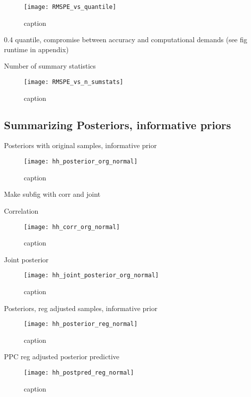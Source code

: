 \begin{figure}[H]
    \centering
    \texttt{[image: RMSPE\_vs\_quantile]}
    \caption{caption}
    \label{fig:fig1}
\end{figure} 

0.4 quantile, compromise between accuracy and computational demands (see fig runtime in appendix)

Number of summary statistics

\begin{figure}[H]
    \centering
    \texttt{[image: RMSPE\_vs\_n\_sumstats]}
    \caption{caption}
    \label{fig:fig1}
\end{figure} 


\subsection{Summarizing Posteriors, informative priors}

Posteriors with original samples, informative prior

\begin{figure}[H]
    \centering
    \texttt{[image: hh\_posterior\_org\_normal]}
    \caption{caption}
    \label{fig:fig1}
\end{figure}

Make subfig with corr and joint

Correlation 

\begin{figure}[H]
    \centering
    \texttt{[image: hh\_corr\_org\_normal]}
    \caption{caption}
    \label{fig:fig1}
\end{figure}

Joint posterior 

\begin{figure}[H]
    \centering
    \texttt{[image: hh\_joint\_posterior\_org\_normal]}
    \caption{caption}
    \label{fig:fig1}
\end{figure}

Posteriors, reg adjusted samples, informative prior

\begin{figure}[H]
    \centering
    \texttt{[image: hh\_posterior\_reg\_normal]}
    \caption{caption}
    \label{fig:fig1}
\end{figure}

PPC reg adjusted posterior predictive 

\begin{figure}[H]
    \centering
    \texttt{[image: hh\_postpred\_reg\_normal]}
    \caption{caption}
    \label{fig:fig1}
\end{figure}


